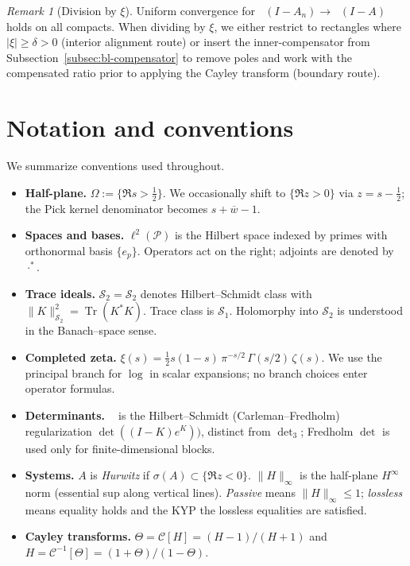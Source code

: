 \documentclass[11pt]{article}
\theoremstyle{definition}
\theoremstyle{remark}
\newtheorem{remark}[theorem]{Remark}
\newcommand{\PP}{\mathcal{P}}
\newcommand{\HS}{\mathcal{S}_2}
\DeclareMathOperator{\Tr}{Tr}
\DeclareMathOperator{\dettwo}{det_2}
\begin{document}
\begin{remark}[Division by \(\xi\)]
Uniform convergence for \(\dettwo(I-A_n)\to\dettwo(I-A)\) holds on all compacts. When dividing by \(\xi\), we either restrict to rectangles where \(|\xi|\ge \delta>0\) (interior alignment route) or insert the inner-compensator from Subsection~\ref{subsec:bl-compensator} to remove poles and work with the compensated ratio prior to applying the Cayley transform (boundary route).
\end{remark}

\section{Notation and conventions}\label{sec:notation}
We summarize conventions used throughout.
\begin{itemize}
 \item \textbf{Half-plane.} \(\Omega:=\{\Re s>\tfrac12\}\). We occasionally shift to \(\{\Re z>0\}\) via \(z=s-\tfrac12\); the Pick kernel denominator becomes \(s+\overline{w}-1\).
 \item \textbf{Spaces and bases.} \(\ell^2(\PP)\) is the Hilbert space indexed by primes with orthonormal basis \(\{e_p\}\). Operators act on the right; adjoints are denoted by \(\cdot^*\).
 \item \textbf{Trace ideals.} \(\HS=\mathcal S_2\) denotes Hilbert--Schmidt class with \(\|K\|_{\HS}^2=\Tr(K^*K)\). Trace class is \(\mathcal S_1\). Holomorphy into \(\HS\) is understood in the Banach--space sense.
 \item \textbf{Completed zeta.} \(\xi(s)=\tfrac12 s(1-s)\,\pi^{-s/2}\,\Gamma(s/2)\,\zeta(s)\). We use the principal branch for \(\log\) in scalar expansions; no branch choices enter operator formulas.
\item \textbf{Determinants.} \(\dettwo\) is the Hilbert--Schmidt (Carleman--Fredholm) regularization \(\det((I-K)e^{K}))\), distinct from \(\det_3\); Fredholm \(\det\) is used only for finite-dimensional blocks.
 \item \textbf{Systems.} \(A\) is \emph{Hurwitz} if \(\sigma(A)\subset\{\Re z<0\}\). \(\|H\|_\infty\) is the half-plane \(H^\infty\) norm (essential sup along vertical lines). \emph{Passive} means \(\|H\|_\infty\le 1\); \emph{lossless} means equality holds and the KYP the lossless equalities are satisfied.
 \item \textbf{Cayley transforms.} \(\Theta=\mathcal C[H]=(H-1)/(H+1)\) and \(H=\mathcal C^{-1}[\Theta]=(1+\Theta)/(1-\Theta)\).
\end{itemize}
\end{document}

